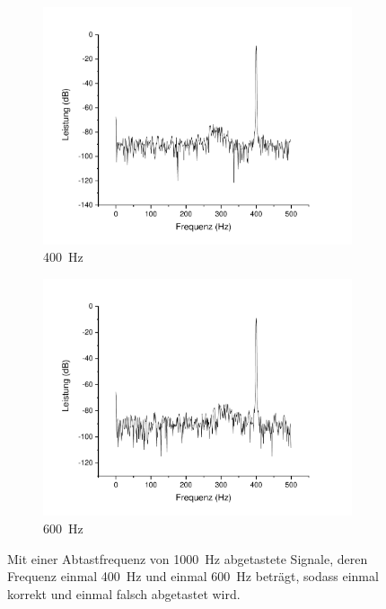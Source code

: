 \documentclass[
a4paper,
12pt,
pagesize,
ngerman
]{scrartcl}
\begin{document}
	\begin{figure}[H]
		\centering
		\begin{subfigure}[t]{0.5\textwidth}
			\centering
			\includegraphics[width=1\textwidth]{Origin-Files/aliasing_abtast1000bei400sig}
			\caption{\SI{400}{\hertz}}
		\end{subfigure}%
		\begin{subfigure}[t]{0.5\textwidth}
			\centering
			\includegraphics[width=1\textwidth]{Origin-Files/aliasing_abtast1000bei600sig}
			\caption{\SI{600}{\hertz}}
		\end{subfigure}
		\label{fig_ali}
		\caption{Mit einer Abtastfrequenz von \SI{1000}{\hertz} abgetastete Signale, deren Frequenz einmal \SI{400}{\hertz} und einmal \SI{600}{\hertz} beträgt, sodass einmal korrekt und einmal falsch abgetastet wird.}
		\centering
	\end{figure}
	
\end{document}
